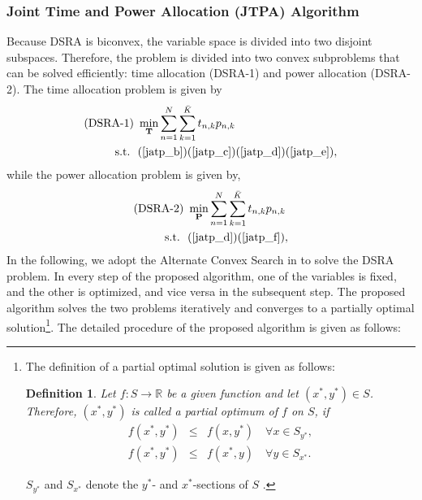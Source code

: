 \documentclass[journal]{IEEEtran} \ifCLASSINFOpdf
\newtheorem{defn}{Definition}\newtheorem{theorem}{Theorem}\newtheorem{prop}{Proposition}
\begin{document}
\subsubsection{Joint Time and Power Allocation (JTPA) Algorithm}
Because DSRA is biconvex, the variable space is divided into two disjoint subspaces.  Therefore, the problem is divided into two convex subproblems that can be solved efficiently: time allocation (DSRA-1) and power allocation (DSRA-2). The time allocation problem is given by
\begin{subequations} \notag
\label{opt_givenP}
\begin{align}
 \mbox{(DSRA-1)}~&\min_{\bf{T}}
   \begin{aligned}[t]
        \sum_{n=1}^N \sum_{k=1}^{\bar{K}} t_{n,k} p_{n,k}
   \end{aligned}  \\
   \text{s.t.~~} &
     (\ref{jatp_b}) (\ref{jatp_c}) (\ref{jatp_d}) (\ref{jatp_e}), \notag
\end{align}
\end{subequations}
while the power allocation problem is given by,
\begin{subequations} \notag
\label{opt_givenT}
\begin{align}
\mbox{(DSRA-2)}~ &\min_{\bf{P}}
   \begin{aligned}[t]
        \sum_{n=1}^N \sum_{k=1}^{\bar{K}} t_{n,k} p_{n,k}
   \end{aligned}  \\
   \text{s.t.~~} &
     (\ref{jatp_d}) (\ref{jatp_f}), \notag
\end{align}
\end{subequations}
In the following, we adopt the Alternate Convex Search in \cite{Gorski2007} to solve the DSRA problem. In every step of the proposed algorithm, one of the variables is fixed, and the other is optimized, and vice versa in the subsequent step. The proposed algorithm solves the two problems iteratively and converges to a partially optimal solution\footnote{The definition of a partial optimal solution is given as follows:
\begin{defn}
\label{def_paropt}
Let $f : S \to \mathbb{R}$ be a given function and let $(x^*, y^*) \in S$. Therefore, $(x^*, y^*)$ is called a partial optimum of $f$ on $S$, if
\begin{eqnarray*}
 f(x^*, y^*) & \leq & f(x, y^*) \quad \forall x \in S_{y^*} \nonumber ,  \\
 f(x^*, y^*) & \leq & f(x^*, y) \quad \forall y \in S_{x^*}.
\end{eqnarray*}
\end{defn} $S_{y^*}$ and $S_{x^*}$ denote the $y^*$- and $x^*$-sections of $S$ \cite{Gorski2007}.}. The detailed procedure of the proposed algorithm is given as follows:
\end{document}
